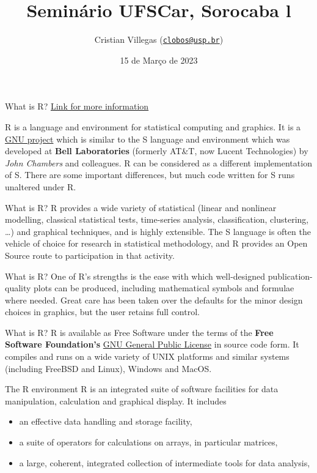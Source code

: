 \documentclass[
  ignorenonframetext,
]{beamer}
\title{Seminário UFSCar, Sorocaba l}
\author{Cristian Villegas
(\href{mailto:clobos@usp.br}{\nolinkurl{clobos@usp.br}})}
\date{15 de Março de 2023}
\institute{Universidade de São Paulo}
\providecommand{\tightlist}{%
  \setlength{\itemsep}{0pt}\setlength{\parskip}{0pt}}
\begin{document}
\frame{\titlepage}

\begin{frame}{What is R?}
\protect\hypertarget{what-is-r}{}
\href{https://www.r-project.org/about.html}{Link for more information}

R is a language and environment for statistical computing and graphics.
It is a \href{https://www.gnu.org/}{GNU project} which is similar to the
S language and environment which was developed at \textbf{Bell
Laboratories} (formerly AT\&T, now Lucent Technologies) by \emph{John
Chambers} and colleagues. R can be considered as a different
implementation of S. There are some important differences, but much code
written for S runs unaltered under R.
\end{frame}

\begin{frame}{What is R?}
\protect\hypertarget{what-is-r-1}{}
R provides a wide variety of statistical (linear and nonlinear
modelling, classical statistical tests, time-series analysis,
classification, clustering, \ldots) and graphical techniques, and is
highly extensible. The S language is often the vehicle of choice for
research in statistical methodology, and R provides an Open Source route
to participation in that activity.
\end{frame}

\begin{frame}{What is R?}
\protect\hypertarget{what-is-r-2}{}
One of R's strengths is the ease with which well-designed
publication-quality plots can be produced, including mathematical
symbols and formulae where needed. Great care has been taken over the
defaults for the minor design choices in graphics, but the user retains
full control.
\end{frame}

\begin{frame}{What is R?}
\protect\hypertarget{what-is-r-3}{}
R is available as Free Software under the terms of the \textbf{Free
Software Foundation's} \href{https://www.r-project.org/COPYING}{GNU
General Public License} in source code form. It compiles and runs on a
wide variety of UNIX platforms and similar systems (including FreeBSD
and Linux), Windows and MacOS.
\end{frame}

\begin{frame}{The R environment}
\protect\hypertarget{the-r-environment}{}
R is an integrated suite of software facilities for data manipulation,
calculation and graphical display. It includes

\begin{itemize}[<+->]
\tightlist
\item
  an effective data handling and storage facility,
\item
  a suite of operators for calculations on arrays, in particular
  matrices,
\item
  a large, coherent, integrated collection of intermediate tools for
  data analysis,
\end{itemize}
\end{frame}
\end{document}
